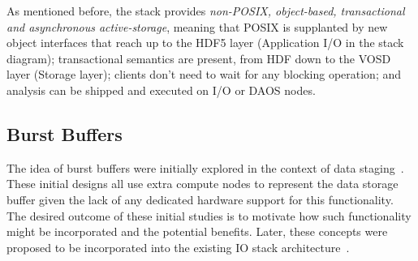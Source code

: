 \documentclass[conference]{IEEEtran}
\begin{document}
As mentioned before, the stack provides \emph{non-POSIX, object-based,
transactional and asynchronous active-storage}, meaning that POSIX is
supplanted by new object interfaces that reach up to the HDF5 layer
(Application I/O in the stack diagram); transactional semantics are present,
from HDF down to the VOSD layer (Storage layer); clients don't need to wait for
any blocking operation; and analysis can be shipped and executed on I/O or DAOS
nodes.

\subsection{Burst Buffers}
\label{sec:burst}

The idea of burst buffers were initially explored in the context of data
staging~\cite{abbasi:2007:datatap,Abbasi:2009:datatap,nisar:2008:staging,zheng:2010:predata}.
These initial designs all use extra compute nodes to represent the data storage
buffer given the lack of any dedicated hardware support for this functionality.
The desired outcome of these initial studies is to motivate how such
functionality might be incorporated and the potential benefits.  Later, these
concepts were proposed to be incorporated into the existing IO stack
architecture~\cite{nowoczynski:2008:zest,bent:2012:challenges,bent:2012:burst-buffer}.
\end{document}
